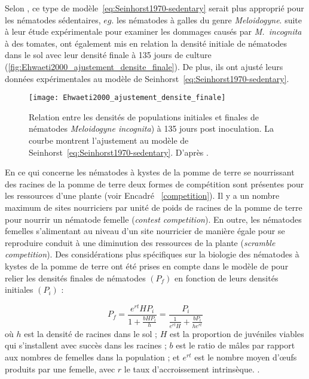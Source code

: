 	  Selon \citet{Seinhorst1967a}, ce type de modèle~\eqref{eq:Seinhorst1970-sedentary} serait plus approprié pour les nématodes sédentaires, $eg.$ les nématodes à galles du genre \textit{Meloidogyne}. 
\citet{Ehwaeti1998} suite à leur étude expérimentale pour examiner les dommages causés par
\textit{M.~incognita} à des  tomates,  ont également mis en relation la densité initiale de  nématodes dans le sol avec leur densité finale à 135 jours de culture (\autoref{fig:Ehwaeti2000_ajustement_densite_finale}). De plus, ils ont ajusté leurs données expérimentales  au  modèle de Seinhorst~\eqref{eq:Seinhorst1970-sedentary}.
\begin{figure}[htp]
\centering \texttt{[image: Ehwaeti2000\_ajustement\_densite\_finale]}
\caption[Densités finales de \textit{Meloidogyne incognita}  en fonction de leurs densités initiales dans le sol à 135 jours de cultures post inoculation \citep{Ehwaeti1998}.]{Relation entre les densités de populations initiales et finales de nématodes \textit{Meloidogyne incognita}) à 135 jours post inoculation. La courbe montrent l'ajustement au modèle de Seinhorst~\eqref{eq:Seinhorst1970-sedentary}. D'après \citet{Ehwaeti1998,Ehwaeti2000}.}
\label{fig:Ehwaeti2000_ajustement_densite_finale}
\end{figure}
	
	
	
	
	En ce qui concerne les nématodes à kystes de la pomme de terre se nourrissant des racines de la pomme de terre deux formes de compétition sont présentes pour les ressources d'une plante (voir Encadré ~\ref{competition}). Il y a un nombre maximum de sites nourriciers par unité de poids de racines de la pomme de terre pour nourrir un nématode femelle (\textit{contest competition}). En outre, les nématodes femelles s'alimentant au niveau d'un site nourricier de manière égale pour se reproduire conduit à une diminution des ressources de la plante (\textit{scramble competition}). 
Des  considérations plus spécifiques sur la biologie des nématodes à kystes de la pomme de terre  ont été prises en compte dans le modèle de \citet{Jones1978b}  pour relier les densités finales de nématodes $(P_f)$ en fonction de leurs densités initiales  $(P_i)$ : 
	
\begin{equation}
	  P_f  = \frac{e^{rt} H P_i}{1 + \frac{b H P_i}{h} }= \frac{P_i}{\frac{1}{e^{rt} H} + \frac{bP_i}{h e^{rt}} }
	  \label{eq:Jones1978}
\end{equation}
où  $h$ est la densité de racines dans le sol ; $H$ est la proportion de juvéniles viables qui s'installent avec  
succès dans les racines ; $b$ est le ratio de mâles par rapport aux nombres de femelles dans la population ; et  
$e^{rt}$ est le  nombre moyen d’œufs produits par une femelle, avec $r$  le taux d'accroissement intrinsèque. . 
	

